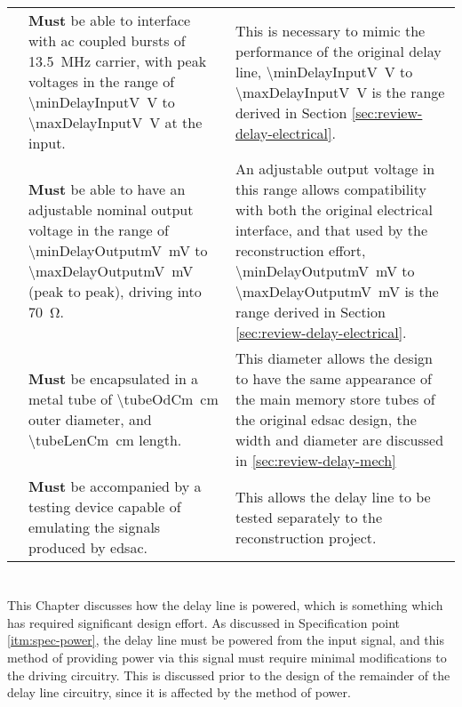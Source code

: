 \begin{longtable}{r  >{\raggedright}p{}  >{\raggedright}p{} }
	{specNo}\thespecNo\label{itm:spec-skew-input-v} & \textbf{Must} be able to interface with \gls{ac} coupled bursts of \SI{13.5}{\mega\hertz} carrier, with peak voltages in the range of \SI{\minDelayInputV}{\volt} to \SI{\maxDelayInputV}{\volt} at the input. & This is necessary to mimic the performance of the original delay line, \SI{\minDelayInputV}{\volt} to \SI{\maxDelayInputV}{\volt} is the range derived in Section \ref{sec:review-delay-electrical}. \tabularnewline
	
	{specNo}\thespecNo\label{itm:spec-skew-output-v} & \textbf{Must} be able to have an adjustable nominal output voltage in the range of \SI{\minDelayOutputmV}{\milli\volt} to \SI{\maxDelayOutputmV}{\milli\volt} (peak to peak), driving into \SI{70}{\ohm}. & An adjustable output voltage in this range allows compatibility with both the original electrical interface, and that used by the reconstruction effort, \SI{\minDelayOutputmV}{\milli\volt} to \SI{\maxDelayOutputmV}{\milli\volt} is the range derived in Section \ref{sec:review-delay-electrical}. \tabularnewline
	
	{specNo}\thespecNo\label{itm:spec-phys-size} & \textbf{Must} be encapsulated in a metal tube of \SI{\tubeOdCm}{\centi\metre} outer diameter, and \SI{\tubeLenCm}{\centi\metre} length. & This diameter allows the design to have the same appearance of the main memory store tubes of the original \gls{edsac} design, the width and diameter are discussed in \ref{sec:review-delay-mech} \tabularnewline
	
	{specNo}\thespecNo\label{itm:spec-testing} & \textbf{Must} be accompanied by a testing device capable of emulating the signals produced by \gls{edsac}. & This allows the delay line to be tested separately to the reconstruction project. \tabularnewline
	
	
\end{longtable}

\chapter{} \label{sec:power}

This Chapter discusses how the delay line is powered, which is something which has required significant design effort. As discussed in Specification point \ref{itm:spec-power}, the delay line must be powered from the input signal, and this method of providing power via this signal must require minimal modifications to the driving circuitry. This is discussed prior to the design of the remainder of the delay line circuitry, since it is affected by the method of power.


